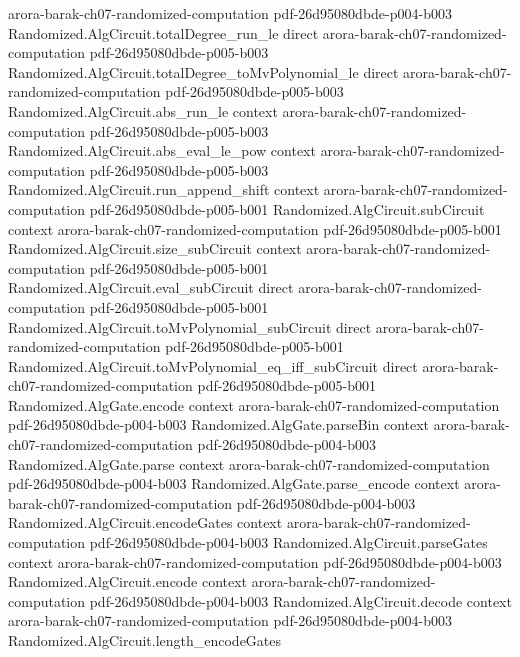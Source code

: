 \begin{theorem}
  {arora-barak-ch07-randomized-computation}
  {pdf-26d95080dbde-p004-b003}
\proofstep
  {Randomized.AlgCircuit.totalDegree_run_le}
  {direct}
  {arora-barak-ch07-randomized-computation}
  {pdf-26d95080dbde-p005-b003}
\proofstep
  {Randomized.AlgCircuit.totalDegree_toMvPolynomial_le}
  {direct}
  {arora-barak-ch07-randomized-computation}
  {pdf-26d95080dbde-p005-b003}
\proofstep
  {Randomized.AlgCircuit.abs_run_le}
  {context}
  {arora-barak-ch07-randomized-computation}
  {pdf-26d95080dbde-p005-b003}
\proofstep
  {Randomized.AlgCircuit.abs_eval_le_pow}
  {context}
  {arora-barak-ch07-randomized-computation}
  {pdf-26d95080dbde-p005-b003}
\proofstep
  {Randomized.AlgCircuit.run_append_shift}
  {context}
  {arora-barak-ch07-randomized-computation}
  {pdf-26d95080dbde-p005-b001}
\proofstep
  {Randomized.AlgCircuit.subCircuit}
  {context}
  {arora-barak-ch07-randomized-computation}
  {pdf-26d95080dbde-p005-b001}
\proofstep
  {Randomized.AlgCircuit.size_subCircuit}
  {context}
  {arora-barak-ch07-randomized-computation}
  {pdf-26d95080dbde-p005-b001}
\proofstep
  {Randomized.AlgCircuit.eval_subCircuit}
  {direct}
  {arora-barak-ch07-randomized-computation}
  {pdf-26d95080dbde-p005-b001}
\proofstep
  {Randomized.AlgCircuit.toMvPolynomial_subCircuit}
  {direct}
  {arora-barak-ch07-randomized-computation}
  {pdf-26d95080dbde-p005-b001}
\proofstep
  {Randomized.AlgCircuit.toMvPolynomial_eq_iff_subCircuit}
  {direct}
  {arora-barak-ch07-randomized-computation}
  {pdf-26d95080dbde-p005-b001}
\proofstep
  {Randomized.AlgGate.encode}
  {context}
  {arora-barak-ch07-randomized-computation}
  {pdf-26d95080dbde-p004-b003}
\proofstep
  {Randomized.AlgGate.parseBin}
  {context}
  {arora-barak-ch07-randomized-computation}
  {pdf-26d95080dbde-p004-b003}
\proofstep
  {Randomized.AlgGate.parse}
  {context}
  {arora-barak-ch07-randomized-computation}
  {pdf-26d95080dbde-p004-b003}
\proofstep
  {Randomized.AlgGate.parse_encode}
  {context}
  {arora-barak-ch07-randomized-computation}
  {pdf-26d95080dbde-p004-b003}
\proofstep
  {Randomized.AlgCircuit.encodeGates}
  {context}
  {arora-barak-ch07-randomized-computation}
  {pdf-26d95080dbde-p004-b003}
\proofstep
  {Randomized.AlgCircuit.parseGates}
  {context}
  {arora-barak-ch07-randomized-computation}
  {pdf-26d95080dbde-p004-b003}
\proofstep
  {Randomized.AlgCircuit.encode}
  {context}
  {arora-barak-ch07-randomized-computation}
  {pdf-26d95080dbde-p004-b003}
\proofstep
  {Randomized.AlgCircuit.decode}
  {context}
  {arora-barak-ch07-randomized-computation}
  {pdf-26d95080dbde-p004-b003}
\proofstep
  {Randomized.AlgCircuit.length_encodeGates}

\end{theorem}
